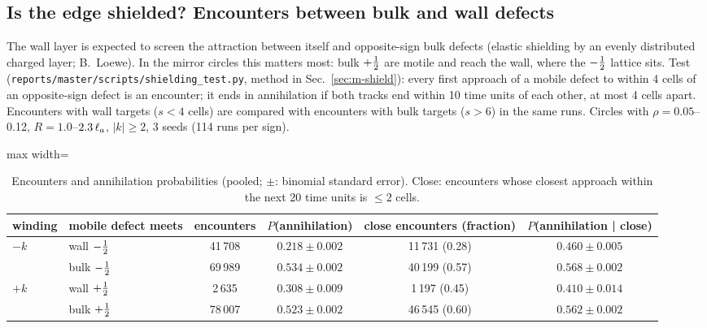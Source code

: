 \subsection{Is the edge shielded? Encounters between bulk and wall defects}\label{sec:shield}
The wall layer is expected to screen the attraction between itself and opposite-sign bulk defects (elastic shielding by an evenly
distributed charged layer; B.~Loewe). In the mirror circles this matters most: bulk $+\tfrac12$ are motile and reach the wall, where the
$-\tfrac12$ lattice sits. Test (\texttt{reports/master/scripts/shielding\_test.py}, method in Sec.~\ref{sec:m-shield}): every first approach
of a mobile defect to within 4 cells of an opposite-sign defect is an encounter; it ends in annihilation if both tracks end within 10 time
units of each other, at most 4 cells apart. Encounters with wall targets ($s<4$ cells) are compared with encounters with bulk targets
($s>6$) in the same runs. Circles with $\rho=0.05$--0.12, $R=1.0$--$2.3\,\ell_a$, $|k|\ge2$, 3 seeds (114 runs per sign).
\begin{table}[H]\centering\small
\caption{Encounters and annihilation probabilities (pooled; $\pm$: binomial standard error). Close: encounters whose closest approach
within the next 20 time units is $\le2$ cells.}\label{tab:shield}
\begin{adjustbox}{max width=\textwidth}
\begin{tabular}{llcccc}\toprule
winding & mobile defect meets & encounters & $P$(annihilation) & close encounters (fraction) & $P$(annihilation | close)\\\midrule
$-k$ & wall $-\tfrac12$ & 41\,708 & $0.218\pm0.002$ & 11\,731 (0.28) & $0.460\pm0.005$\\
     & bulk $-\tfrac12$ & 69\,989 & $0.534\pm0.002$ & 40\,199 (0.57) & $0.568\pm0.002$\\
$+k$ & wall $+\tfrac12$ & 2\,635 & $0.308\pm0.009$ & 1\,197 (0.45) & $0.410\pm0.014$\\
     & bulk $+\tfrac12$ & 78\,007 & $0.523\pm0.002$ & 46\,545 (0.60) & $0.562\pm0.002$\\\bottomrule
\end{tabular}
\end{adjustbox}
\end{table}
